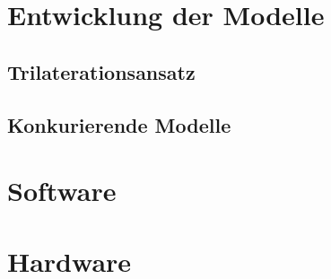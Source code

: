 
\section{Entwicklung der Modelle}
\lipsum[1-3]

\subsection{Trilaterationsansatz}
%
\lipsum[1-1]

\subsection{Konkurierende Modelle}
\lipsum[1-1]

\section{Software}
\lipsum[1-3]

\section{Hardware}
\lipsum[1-3]
